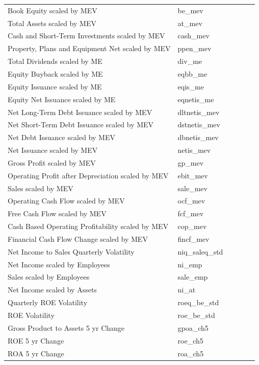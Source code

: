 \documentclass[12pt,title,fleqn]{article}
\begin{document}
\begin{longtable}{p{5cm}p{2cm}p{5cm}lll}
Book Equity scaled by MEV & be\_mev & & & & \\
Total Assets scaled by MEV & at\_mev & & & & \\
Cash and Short-Term Investments scaled by MEV & cash\_mev & & & & \\
Property, Plans and Equipment Net scaled by MEV & ppen\_mev & & & & \\
Total Dividends scaled by ME & div\_me & & & & \\
Equity Buyback scaled by ME & eqbb\_me & & & & \\
Equity Issuance scaled by ME & eqis\_me & & & & \\
Equity Net Issuance scaled by ME & eqnetis\_me & & & & \\
Net Long-Term Debt Issuance scaled by MEV & dltnetis\_mev & & & & \\
Net Short-Term Debt Issuance scaled by MEV & dstnetis\_mev & & & & \\
Net Debt Issuance scaled by MEV & dbnetis\_mev & & & & \\
Net Issuance scaled by MEV & netis\_mev & & & & \\
Gross Profit scaled by MEV & gp\_mev & & & & \\
Operating Profit after Depreciation scaled by MEV & ebit\_mev & & & & \\
Sales scaled by MEV & sale\_mev & & & & \\
Operating Cash Flow scaled by MEV & ocf\_mev & & & & \\
Free Cash Flow scaled by MEV & fcf\_mev & & & & \\
Cash Based Operating Profitability scaled by MEV & cop\_mev & & & & \\
Financial Cash Flow Change scaled by MEV & fincf\_mev & & & & \\
Net Income to Sales Quarterly Volatility & niq\_saleq\_std & & & & \\
Net Income scaled by Employees & ni\_emp & & & & \\
Sales scaled by Employees & sale\_emp & & & & \\
Net Income scaled by Assets & ni\_at & & & & \\
Quarterly ROE Volatility & roeq\_be\_std & & & & \\
ROE Volatility & roe\_be\_std & & & & \\
Gross Product to Assets 5 yr Change & gpoa\_ch5 & & & & \\
ROE 5 yr Change & roe\_ch5 & & & & \\
ROA 5 yr Change & roa\_ch5 & & & & \\

\end{longtable}
\end{document}
